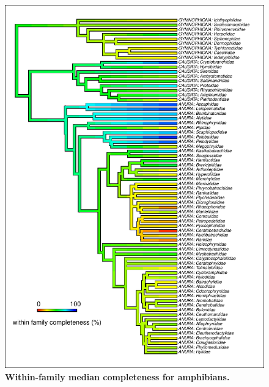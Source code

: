 \documentclass[11pt]{article}
\begin{document}
\begin{figure}[h!]
\centering
\includegraphics[scale=1.2]{figures/NA_phylo_patterns/Amphibians_completeness}
\caption[Within-family median completeness for amphibians]{\textbf{Within-family median completeness for amphibians.}}
\label{}
\end{figure}

\pagebreak
\end{document}
